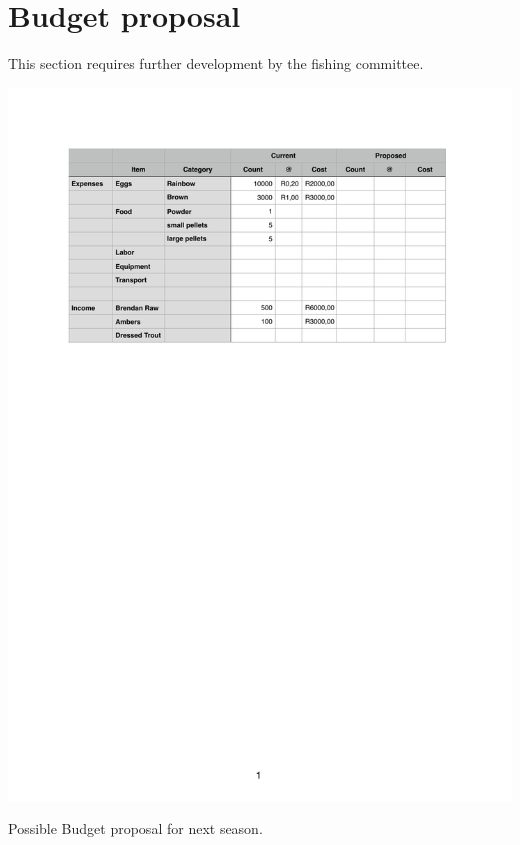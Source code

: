 \section{Budget proposal}

This section requires further development by the fishing committee.

\begin{table}[H]
  \centering
  \includegraphics[scale = 0.9]{tables/TablesBudget.pdf}
   \caption{Possible Budget proposal for next season.}
  \label{tab:Budget}
\end{table}
 


